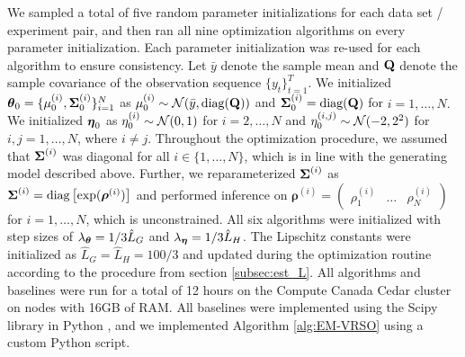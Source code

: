 We sampled a total of five random parameter initializations for each data set / experiment pair, and then ran all nine optimization algorithms on every parameter initialization. Each parameter initialization was re-used for each algorithm to ensure consistency. Let $\bar y$ denote the sample mean and $\mathbf{Q}$ denote the sample covariance of the observation sequence $\{y_t\}_{t=1}^T$. We initialized $\boldsymbol{\theta}_0 = \{\mu^{(i)}_0,\boldsymbol{\Sigma}^{(i)}_0\}_{i=1}^N$ as
%
    $\mu^{(i)}_0 \sim \mathcal{N}(\bar y, \text{diag}(\mathbf{Q}))$ and $\boldsymbol{\Sigma}^{(i)}_0 = \text{diag}(\mathbf{Q})$ for $i = 1,\ldots,N.$ We initialized $\boldsymbol{\eta}_0$ as
    $\eta^{(i)}_0 \sim \mathcal{N}(0,1)$ for $i = 2,\ldots,N$ and
    $\eta^{(i,j)}_0 \sim \mathcal{N}(-2,2^2)$ for $i,j = 1,\ldots,N$, where $i \neq j$.
%
Throughout the optimization procedure, we assumed that $\boldsymbol{\Sigma}^{(i)}$ was diagonal for all $i \in \{1,\ldots,N\}$, which is in line with the generating model described above. Further, we reparameterized $\boldsymbol{\Sigma}^{(i)}$ as 
%
    $\boldsymbol{\Sigma}^{(i)} = \text{diag}\left[\exp(\boldsymbol{\rho}^{(i)})\right]$
%
and performed inference on $\boldsymbol{\rho}^{(i)} = \begin{pmatrix} \rho^{(i)}_1 & \ldots & \rho^{(i)}_N \end{pmatrix}$ for $i = 1,\ldots,N$, which is unconstrained.
All six algorithms were initialized with step sizes of $\lambda_{\boldsymbol{\theta}} = 1/3 \hat L_G$ and $\lambda_{\boldsymbol{\eta}} = 1/3 \hat L_H$. The Lipschitz constants were initialized as $\hat L_G = \hat L_H = 100/3$ and updated during the optimization routine according to the procedure from section \ref{subsec:est_L}. 
%
All algorithms and baselines were run for a total of 12 hours on the Compute Canada Cedar cluster on nodes with 16GB of RAM.
%
All baselines were implemented using the Scipy library in Python \citep{Virtanen:2019}, and we implemented Algorithm \ref{alg:EM-VRSO} using a custom Python script.

